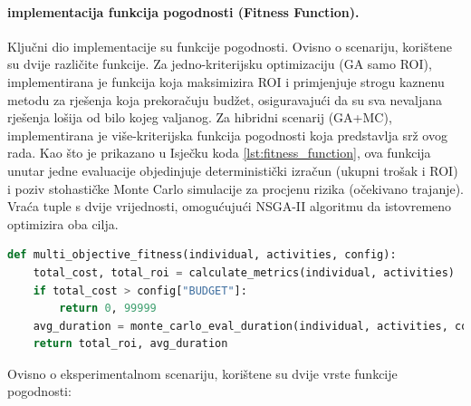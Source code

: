 \paragraph{implementacija funkcija pogodnosti (Fitness Function).}
Ključni dio implementacije su funkcije pogodnosti. Ovisno o scenariju, korištene su dvije različite funkcije. Za jedno-kriterijsku optimizaciju (GA samo ROI), implementirana je funkcija koja maksimizira ROI i primjenjuje strogu kaznenu metodu za rješenja koja prekoračuju budžet, osiguravajući da su sva nevaljana rješenja lošija od bilo kojeg valjanog.
Za hibridni scenarij (GA+MC), implementirana je više-kriterijska funkcija pogodnosti koja predstavlja srž ovog rada. Kao što je prikazano u Isječku koda \ref{lst:fitness_function}, ova funkcija unutar jedne evaluacije objedinjuje deterministički izračun (ukupni trošak i ROI) i poziv stohastičke Monte Carlo simulacije za procjenu rizika (očekivano trajanje). Vraća tuple s dvije vrijednosti, omogućujući NSGA-II algoritmu da istovremeno optimizira oba cilja.
\begin{lstlisting}[language=Python, caption={Više-kriterijska funkcija pogodnosti}, label={lst:fitness_function}, captionpos=b ]
def multi_objective_fitness(individual, activities, config):
    total_cost, total_roi = calculate_metrics(individual, activities)
    if total_cost > config["BUDGET"]:
        return 0, 99999
    avg_duration = monte_carlo_eval_duration(individual, activities, config)
    return total_roi, avg_duration
\end{lstlisting}
Ovisno o eksperimentalnom scenariju, korištene su dvije vrste funkcije pogodnosti:
